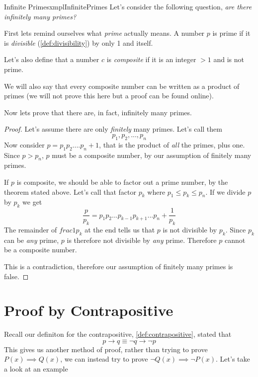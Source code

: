 \begin{exmpl}[label={exmpl:InfinitePrimes}]{Infinite Primes}{xmplInfinitePrimes}
    Let's consider the following question, \emph{are there infinitely many primes?}

    First lets remind ourselves what \emph{prime} actually means. A number $p$ is prime if it is \emph{divisible} (\cref{def:divisibility}) by only 1 and itself.

    Let's also define that a number $c$ is \emph{composite} if it is an integer $> 1$ and is not prime.

    We will also say that every composite number can be written as a product of primes (we will not prove this here but a proof can be found online).

    Now lets prove that there are, in fact, infinitely many primes.
    \begin{proof}
        Let's assume there are only \emph{finitely} many primes. Let's call them
        $$p_1,p_2,...,p_n$$
        Now consider $p = p_1p_2....p_n + 1$, that is the product of \emph{all} the primes, plus one. Since $p > p_n$, $p$ must be a composite number, by our assumption of finitely many primes.

        If $p$ is composite, we should be able to factor out a prime number, by the theorem stated above. Let's call that factor $p_k$ where $p_1 \leq p_k \leq p_n$. If we divide $p$ by $p_k$ we get
        $$\frac{p}{p_k} = p_1p_2...p_{k-1}p_{k+1}...p_n + \frac{1}{p_k}$$
        The remainder of $frac{1}{p_k}$ at the end tells us that $p$ is not divisible by $p_k$. Since $p_k$ can be \emph{any} prime, $p$ is therefore not divisible by \emph{any} prime. Therefore $p$ cannot be a composite number.

        This is a contradiction, therefore our assumption of finitely many primes is false.
    \end{proof}
\end{exmpl}

\section{Proof by Contrapositive}
Recall our definiton for the contrapositive, \cref{def:contrapositive}, stated that
$$p \to q \equiv \lnot q \to \lnot p$$
This gives us another method of proof, rather than trying to prove $P(x) \implies Q(x)$, we can instead try to prove $\lnot Q(x) \implies \lnot P(x)$. Let's take a look at an example

